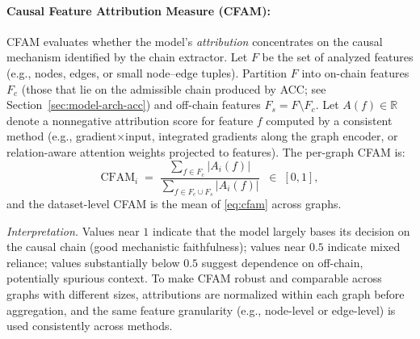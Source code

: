 \documentclass{buthesis}
\begin{document}
\paragraph{Causal Feature Attribution Measure (CFAM):}
CFAM evaluates whether the model’s \emph{attribution} concentrates on the causal mechanism identified by the chain extractor. Let $F$ be the set of analyzed features (e.g., nodes, edges, or small node–edge tuples). Partition $F$ into on-chain features $F_c$ (those that lie on the admissible chain produced by ACC; see Section~\ref{sec:model-arch-acc}) and off-chain features $F_s=F\setminus F_c$. Let $A(f)\in\mathbb{R}$ denote a nonnegative attribution score for feature $f$ computed by a consistent method (e.g., gradient$\times$input, integrated gradients along the graph encoder, or relation-aware attention weights projected to features). The per-graph CFAM is:
\begin{equation}
\label{eq:cfam}
\mathrm{CFAM}_i \;=\; 
\frac{\sum_{f\in F_c} |A_i(f)|}{\sum_{f\in F_c\cup F_s} |A_i(f)|}
\;\;\in\;[0,1],
\end{equation}
and the dataset-level CFAM is the mean of \eqref{eq:cfam} across graphs.

\textit{Interpretation.} Values near $1$ indicate that the model largely bases its decision on the causal chain (good mechanistic faithfulness); values near $0.5$ indicate mixed reliance; values substantially below $0.5$ suggest dependence on off-chain, potentially spurious context. To make CFAM robust and comparable across graphs with different sizes, attributions are normalized within each graph before aggregation, and the same feature granularity (e.g., node-level or edge-level) is used consistently across methods.
\end{document}
